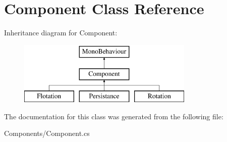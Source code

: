 \hypertarget{class_component}{}\section{Component Class Reference}
\label{class_component}
Inheritance diagram for Component\+:\begin{figure}[H]
\begin{center}
\leavevmode
\includegraphics[height=3.000000cm]{class_component}
\end{center}
\end{figure}


The documentation for this class was generated from the following file\+:\begin{DoxyCompactItemize}
\item 
Components/Component.\+cs\end{DoxyCompactItemize}
